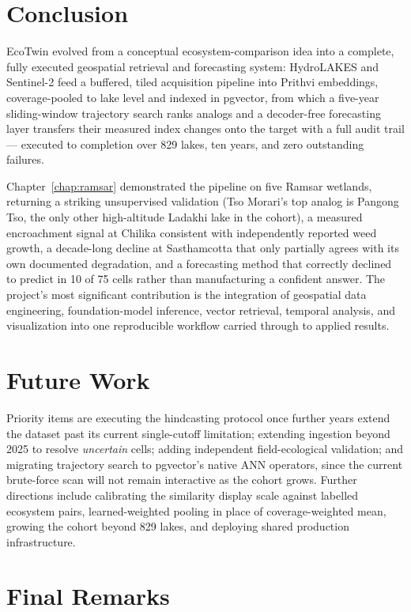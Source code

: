 \documentclass[12pt,a4paper,oneside]{report}
\begin{document}
\section{Conclusion}

EcoTwin evolved from a conceptual ecosystem-comparison idea into a
complete, fully executed geospatial retrieval and forecasting
system: HydroLAKES and Sentinel-2 feed a buffered, tiled acquisition
pipeline into Prithvi embeddings, coverage-pooled to lake level and
indexed in pgvector, from which a five-year sliding-window
trajectory search ranks analogs and a decoder-free forecasting layer
transfers their measured index changes onto the target with a full
audit trail --- executed to completion over 829 lakes, ten years,
and zero outstanding failures.

Chapter~\ref{chap:ramsar} demonstrated the pipeline on five Ramsar
wetlands, returning a striking unsupervised validation (Tso Morari's
top analog is Pangong Tso, the only other high-altitude Ladakhi lake
in the cohort), a measured encroachment signal at Chilika consistent
with independently reported weed growth, a decade-long decline at
Sasthamcotta that only partially agrees with its own documented
degradation, and a forecasting method that correctly declined to
predict in 10 of 75 cells rather than manufacturing a confident
answer. The project's most significant contribution is the
integration of geospatial data engineering, foundation-model
inference, vector retrieval, temporal analysis, and visualization
into one reproducible workflow carried through to applied results.

\section{Future Work}
\label{sec:future}

Priority items are executing the hindcasting protocol once further
years extend the dataset past its current single-cutoff limitation;
extending ingestion beyond 2025 to resolve \emph{uncertain} cells;
adding independent field-ecological validation; and migrating
trajectory search to pgvector's native ANN operators, since the
current brute-force scan will not remain interactive as the cohort
grows. Further directions include calibrating the similarity display
scale against labelled ecosystem pairs, learned-weighted pooling in
place of coverage-weighted mean, growing the cohort beyond 829
lakes, and deploying shared production infrastructure.

\section{Final Remarks}
\end{document}
